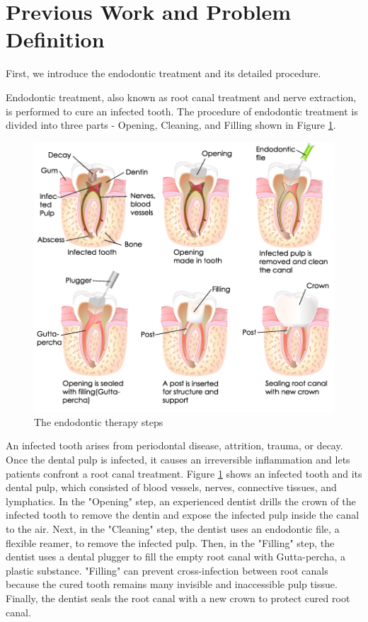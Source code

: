 \section{Previous Work and Problem Definition}
\hspace*{6mm}First, we introduce the endodontic treatment and its detailed procedure.
\par
Endodontic treatment, also known as root canal treatment and nerve extraction, is performed to cure an infected tooth. The procedure of endodontic treatment is divided into three parts - Opening, Cleaning, and Filling shown in  Figure \ref{fig:endo-procedure}.
\begin{figure}[htbp]
\begin{center}
\includegraphics[width=0.8\linewidth]{Images/endo-procedure.png}
\caption{
The endodontic therapy steps
}\label{fig:endo-procedure}
\end{center}
\end{figure}
\par
An infected tooth arises from periodontal disease, attrition, trauma, or decay. Once the dental pulp is infected, it causes an irreversible inflammation and lets patients confront a root canal treatment. Figure \ref{fig:endo-procedure} shows an infected tooth and its dental pulp, which consisted of blood vessels, nerves, connective tissues, and lymphatics. In the "Opening" step, an experienced dentist drills the crown of the infected tooth to remove the dentin and expose the infected pulp inside the canal to the air. Next, in the "Cleaning" step, the dentist uses an endodontic file, a flexible reamer, to remove the infected pulp. Then, in the "Filling" step, the dentist uses a dental plugger to fill the empty root canal with Gutta-percha, a plastic substance. "Filling" can prevent cross-infection between root canals because the cured tooth remains many invisible and inaccessible pulp tissue. Finally, the dentist seals the root canal with a new crown to protect cured root canal. 
